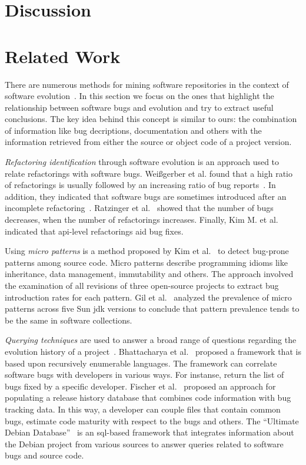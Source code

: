 \documentclass[conference]{llncs}
\begin{document}
\section{Discussion}
\label{sec:dis}

\section{Related Work}
\label{sec:rel}

There are numerous methods for mining software repositories in the context
of software evolution~\cite{KCM07}. In this section we focus on the ones
that highlight the relationship between software bugs and evolution and try to
extract useful conclusions. The key idea behind this concept is
similar to ours: the combination of information like bug decriptions,
documentation and others with the information retrieved from either the source
or object code of a project version.

{\it Refactoring identification} through software evolution is an approach used to
relate refactorings with software bugs. Wei{\ss}gerber et al. found that a high
ratio of refactorings is usually followed by an increasing ratio of bug
reports~\cite{WD06}. In addition, they indicated that software bugs are sometimes introduced
after an incomplete refactoring~\cite{GW05}.
Ratzinger et al.~\cite{RSG08} showed that the number of bugs decreases, when the number of
refactorings increases. Finally, Kim M. et al.~\cite{KCK11} indicated that {\sc api}-level
refactorings aid bug fixes.

Using {\it micro patterns} is a method proposed by Kim et al.~\cite{KPW06}
to detect bug-prone patterns among source code. Micro patterns describe programming
idioms like inheritance, data management, immutability and others. The approach involved
the examination of all revisions of three open-source projects to extract bug
introduction rates for each pattern. Gil et al.~\cite{GM05} analyzed the
prevalence of micro patterns across five Sun {\sc jdk} versions to conclude that
pattern prevalence tends to be the same in software collections.

{\it Querying techniques} are used to answer a broad range of questions
regarding the evolution history of a project~\cite{HG05}. Bhattacharya et
al.~\cite{BN11}\cite{B11} proposed a framework that is based upon
recursively enumerable languages. The framework can correlate software
bugs with developers in various ways. For instanse, return the list of
bugs fixed by a specific developer. Fischer et al.~\cite{FPG03} proposed
an approach for populating a release history database that combines code
information with bug tracking data. In this way, a developer can couple files
that contain common bugs, estimate code maturity with respect to the bugs
and others. The ``Ultimate Debian Database''~\cite{NZ10} is an {\sc sql}-based
framework that integrates information about the Debian project from various
sources to answer queries related to software bugs and source code.
\end{document}
